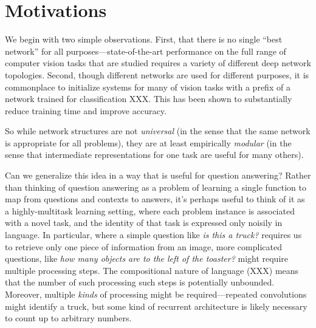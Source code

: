 \section{Motivations}

%
We begin with two simple observations. First, that there is no single ``best
network'' for all purposes---state-of-the-art performance on the full range of
computer vision tasks that are studied requires a variety of different deep
network topologies. Second, though different networks are used for different
purposes, it is commonplace to initialize systems for many of vision tasks with
a prefix of a network trained for classification \cite{Long14FullyConvolutional} XXX. 
This has been shown to substantially reduce training time and improve accuracy. 

So while network structures are not \emph{universal} (in the sense that the same
network is appropriate for all problems), they are at least empirically
\emph{modular} (in the sense that intermediate representations for one task are
useful for many others). 

Can we generalize this idea in a way that is useful for question answering?
Rather than thinking of question answering as a problem of learning a single
function to map from questions and contexts to answers, it's perhaps useful to
think of it as a highly-multitask learning setting, where each problem instance
is associated with a novel task, and the identity of that task is expressed only
noisily in language. In particular, where a simple question like \emph{is this a
truck?} requires us to retrieve only one piece of information from an image,
more complicated questions, like \emph{how many objects are to the left of
the toaster?} might require multiple processing steps. The compositional nature
of language (XXX) means that the number of such processing such steps is
potentially unbounded. Moreover, multiple \emph{kinds} of processing might be
required---repeated convolutions might identify a truck, but some kind of
recurrent architecture is likely necessary to count up to arbitrary numbers.

